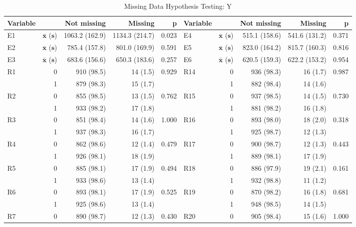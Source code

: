 \begin{table}[ht]
\centering
\begingroup\footnotesize
\caption{Missing Data Hypothesis Testing: Y} 
\label{tab:missing}
\begin{adjustbox}{width=\textwidth}
\begin{tabular}{lrrrr|lrrrr}
 \textbf{Variable} &  & \textbf{Not missing} & \textbf{Missing} & \textbf{p} & \textbf{Variable} &  & \textbf{Not missing} & \textbf{Missing} & \textbf{p}\\ 
  \hline
E1 & $\mathbf{\bar{x}}$ ($\mathbf{s}$) & 1063.2 (162.9) & 1134.3 (214.7) & 0.023 & E4 & $\mathbf{\bar{x}}$ ($\mathbf{s}$) & 515.1 (158.6) & 541.6 (131.2) & 0.371 \\
E2 & $\mathbf{\bar{x}}$ ($\mathbf{s}$) & 785.4 (157.8) & 801.0 (169.9) & 0.591 & E5 & $\mathbf{\bar{x}}$ ($\mathbf{s}$) & 823.0 (164.2) & 815.7 (160.3) & 0.816 \\
E3 & $\mathbf{\bar{x}}$ ($\mathbf{s}$) & 683.6 (156.6) & 650.3 (183.6) & 0.257 & E6 & $\mathbf{\bar{x}}$ ($\mathbf{s}$) & 620.5 (159.3) & 622.2 (153.2) & 0.954 \\
\hline
R1 & 0 & 910 (98.5) & 14 (1.5) & 0.929 & R14 & 0 & 936 (98.3) & 16 (1.7) & 0.987 \\
   & 1 & 879 (98.3) & 15 (1.7) &  &  & 1 & 882 (98.4) & 14 (1.6) &  \\
R2 & 0 & 855 (98.5) & 13 (1.5) & 0.762 & R15 & 0 & 937 (98.5) & 14 (1.5) & 0.730 \\
   & 1 & 933 (98.2) & 17 (1.8) &  &  & 1 & 881 (98.2) & 16 (1.8) &  \\
R3 & 0 & 851 (98.4) & 14 (1.6) & 1.000 & R16 & 0 & 893 (98.0) & 18 (2.0) & 0.318 \\
   & 1 & 937 (98.3) & 16 (1.7) &  &  & 1 & 925 (98.7) & 12 (1.3) &  \\
R4 & 0 & 862 (98.6) & 12 (1.4) & 0.479 & R17 & 0 & 900 (98.7) & 12 (1.3) & 0.443 \\
   & 1 & 926 (98.1) & 18 (1.9) &  &  & 1 & 889 (98.1) & 17 (1.9) &  \\
R5 & 0 & 885 (98.1) & 17 (1.9) & 0.494 & R18 & 0 & 886 (97.9) & 19 (2.1) & 0.161 \\
   & 1 & 933 (98.6) & 13 (1.4) &  &  & 1 & 932 (98.8) & 11 (1.2) &  \\
R6 & 0 & 893 (98.1) & 17 (1.9) & 0.525 & R19 & 0 & 870 (98.2) & 16 (1.8) & 0.681 \\
   & 1 & 925 (98.6) & 13 (1.4) &  &  & 1 & 948 (98.5) & 14 (1.5) &  \\
R7 & 0 & 890 (98.7) & 12 (1.3) & 0.430 & R20 & 0 & 905 (98.4) & 15 (1.6) & 1.000 \\

\end{tabular}
\end{adjustbox}
\end{table}
